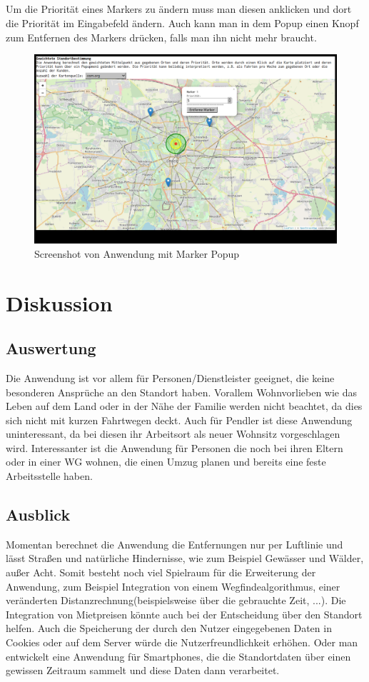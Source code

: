 \documentclass[a4paper, 12pt]{scrreprt}
\begin{document}
\\\\\\\\
Um die Priorität eines Markers zu ändern muss man diesen anklicken und dort die Priorität im Eingabefeld ändern. Auch kann man in dem Popup einen Knopf zum Entfernen des Markers drücken, falls man ihn nicht mehr braucht.\\
\begin{figure}[h]
\includegraphics[width=\linewidth]{bell3_1.png}\caption{Screenshot von Anwendung mit Marker Popup}
\end{figure}
\chapter{Diskussion}
\section{Auswertung}
Die Anwendung ist vor allem für Personen/Dienstleister geeignet, die keine besonderen Ansprüche an den Standort haben.
Vorallem Wohnvorlieben wie das Leben auf dem Land oder in der Nähe der Familie werden nicht beachtet, da dies sich nicht mit kurzen Fahrtwegen deckt.
Auch für Pendler ist diese Anwendung uninteressant, da bei diesen ihr Arbeitsort als neuer Wohnsitz vorgeschlagen wird.
Interessanter ist die Anwendung für Personen die noch bei ihren Eltern oder in einer WG wohnen, die einen Umzug planen und bereits eine feste Arbeitsstelle haben. 
\section{Ausblick}
Momentan berechnet die Anwendung die Entfernungen nur per Luftlinie und lässt Straßen und natürliche Hindernisse, wie zum Beispiel Gewässer und Wälder, außer Acht.
Somit besteht noch viel Spielraum für die Erweiterung der Anwendung, zum Beispiel Integration von einem Wegfindealgorithmus, einer veränderten Distanzrechnung(beispielsweise über die gebrauchte Zeit, ...).
Die Integration von Mietpreisen könnte auch bei der Entscheidung über den Standort helfen.
Auch die Speicherung der durch den Nutzer eingegebenen Daten in Cookies oder auf dem Server würde die Nutzerfreundlichkeit erhöhen. Oder man entwickelt eine Anwendung für Smartphones, die die Standortdaten über einen gewissen Zeitraum sammelt und diese Daten dann verarbeitet.


\listoffigures
\end{document}
